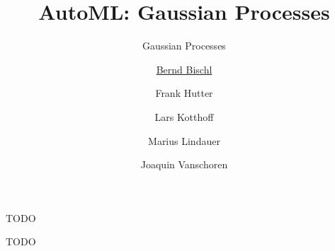 




\title[AutoML: GPs]{AutoML: Gaussian Processes} %
\subtitle{Gaussian Processes} %
\author[Marius Lindauer]{\underline{Bernd Bischl} \and Frank Hutter \and Lars Kotthoff\newline \and Marius Lindauer \and Joaquin Vanschoren}
\institute{}
\date{}





	
	\maketitle
	

\begin{frame}[c]{TODO}

TODO

\end{frame}


